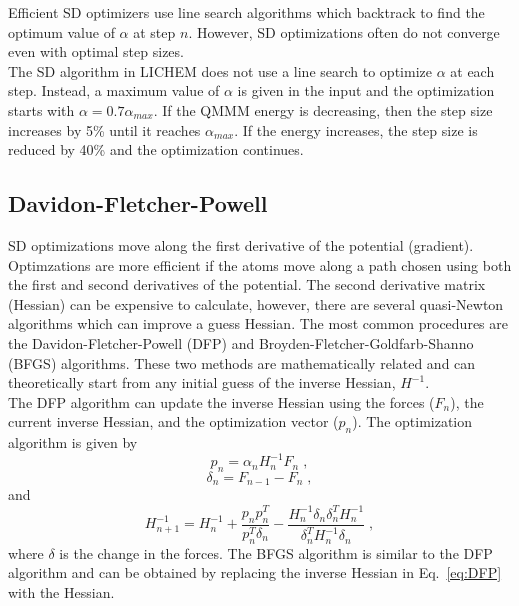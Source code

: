 \documentclass[12pt]{report}
\begin{document}
Efficient SD optimizers use line search algorithms which backtrack to find the
optimum value of $\alpha$ at step $n$.
However, SD optimizations often do not converge even with optimal step
sizes. \\

The SD algorithm in LICHEM does not use a line search to optimize $\alpha$ at
each step.
Instead, a maximum value of $\alpha$ is given in the input and the
optimization starts with $\alpha=0.7\alpha_{max}$.
If the QMMM energy is decreasing, then the step size increases by 5\% until it
reaches $\alpha_{max}$.
If the energy increases, the step size is reduced by 40\% and the optimization
continues.

\subsection{Davidon-Fletcher-Powell}

SD optimizations move along the first derivative of the potential (gradient).
Optimzations are more efficient if the atoms move along a path chosen using
both the first and second derivatives of the potential.
The second derivative matrix (Hessian) can be expensive to calculate, however,
there are several quasi-Newton algorithms which can improve a guess Hessian.
The most common procedures are the Davidon-Fletcher-Powell (DFP) and
Broyden-Fletcher-Goldfarb-Shanno (BFGS) algorithms.
These two methods are mathematically related and can theoretically start from
any initial guess of the inverse Hessian, $H^{-1}$. \\

The DFP algorithm can update the inverse Hessian using the forces ($F_n$), the
current inverse Hessian, and the optimization vector ($p_n$).
The optimization algorithm is given by
\begin{equation}
 p_n = \alpha_n H_n^{-1} F_n \; ,
\end{equation}
\begin{equation}
 \delta_n = F_{n-1}-F_n \; ,
\end{equation}
and
\begin{equation}
 \label{eq:DFP}
 H_{n+1}^{-1} = H_n^{-1} + \frac{p_n p_n^T}{p_n^T \delta_n} -
 \frac{H_n^{-1} \delta_n \delta_n^T H_n^{-1}}{\delta_n^T H_n^{-1} \delta_n}
 \; ,
\end{equation}
where $\delta$ is the change in the forces.
The BFGS algorithm is similar to the DFP algorithm and can be obtained by
replacing the inverse Hessian in Eq.\ \ref{eq:DFP} with the Hessian. \\
\end{document}

